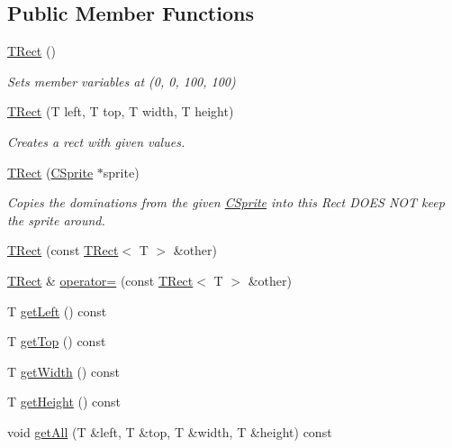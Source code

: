 \subsection*{Public Member Functions}
\begin{DoxyCompactItemize}
\item 
\hyperlink{classengine_1_1TRect_a6ac360fa89c33540e1aacf0217bcbff7}{T\-Rect} ()
\begin{DoxyCompactList}\small\item\em Sets member variables at (0, 0, 100, 100) \end{DoxyCompactList}\item 
\hyperlink{classengine_1_1TRect_af74e4c9b5d570438a25c8b92d9b946d4}{T\-Rect} (T left, T top, T width, T height)
\begin{DoxyCompactList}\small\item\em Creates a rect with given values. \end{DoxyCompactList}\item 
\hyperlink{classengine_1_1TRect_a3d400a91242673bf38496a724543f98a}{T\-Rect} (\hyperlink{classCSprite}{C\-Sprite} $\ast$sprite)
\begin{DoxyCompactList}\small\item\em Copies the dominations from the given \hyperlink{classCSprite}{C\-Sprite} into this Rect D\-O\-E\-S N\-O\-T keep the sprite around. \end{DoxyCompactList}\item 
\hyperlink{classengine_1_1TRect_a4a4706672995ba4fabd6be900b58ce1f}{T\-Rect} (const \hyperlink{classengine_1_1TRect}{T\-Rect}$<$ T $>$ \&other)
\item 
\hyperlink{classengine_1_1TRect}{T\-Rect} \& \hyperlink{classengine_1_1TRect_a4ccd990e5432e94ca3b8280cf9c73e0e}{operator=} (const \hyperlink{classengine_1_1TRect}{T\-Rect}$<$ T $>$ \&other)
\item 
T \hyperlink{classengine_1_1TRect_aa813022ee910757ce429aae829023d53}{get\-Left} () const 
\item 
T \hyperlink{classengine_1_1TRect_ae622bc0564f8d15556f32844be907adf}{get\-Top} () const 
\item 
T \hyperlink{classengine_1_1TRect_afe9eb87a07784381d0172cebac589ed0}{get\-Width} () const 
\item 
T \hyperlink{classengine_1_1TRect_ac377947f57b80de2c3c94d21e66e97cf}{get\-Height} () const 
\item 
void \hyperlink{classengine_1_1TRect_a73a225ba48ce45915087fe7a94c2ab1f}{get\-All} (T \&left, T \&top, T \&width, T \&height) const 

\end{DoxyCompactItemize}

